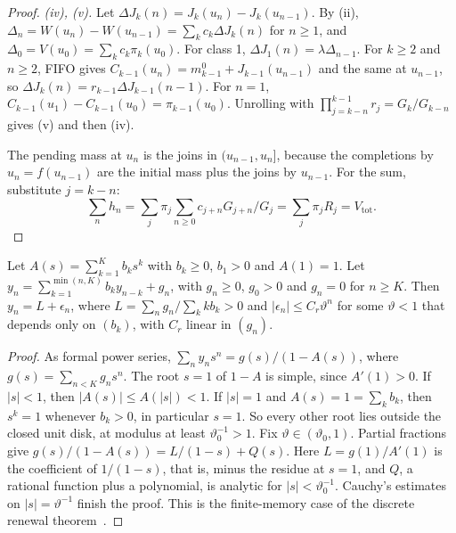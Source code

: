 \begin{proof}
\emph{(iv), (v).} Let $\Delta J_k(n)=J_k(u_n)-J_k(u_{n-1})$. By (ii), $\Delta_n=W(u_n)-W(u_{n-1})=\sum_kc_k\Delta J_k(n)$ for
$n\ge1$, and $\Delta_0=V(u_0)=\sum_kc_k\pi_k(u_0)$. For class 1, $\Delta J_1(n)=\lambda\Delta_{n-1}$. For $k\ge2$ and
$n\ge2$, FIFO gives $C_{k-1}(u_n)=m^0_{k-1}+J_{k-1}(u_{n-1})$ and the same at $u_{n-1}$, so
$\Delta J_k(n)=r_{k-1}\Delta J_{k-1}(n-1)$. For $n=1$, $C_{k-1}(u_1)-C_{k-1}(u_0)=\pi_{k-1}(u_0)$. Unrolling with
$\prod_{j=k-n}^{k-1}r_j=G_k/G_{k-n}$ gives (v) and then (iv).

The pending mass at $u_n$ is the joins in $(u_{n-1},u_n]$, because the completions by $u_n=f(u_{n-1})$ are the initial mass
plus the joins by $u_{n-1}$. For the sum, substitute $j=k-n$:
\[
\sum_nh_n=\sum_j\pi_j\sum_{n\ge0}c_{j+n}G_{j+n}/G_j=\sum_j\pi_jR_j=V_{\mathrm{tot}}.
\]
\end{proof}

\begin{lemma}\label{lem:renewal}
Let $A(s)=\sum_{k=1}^Kb_ks^k$ with $b_k\ge0$, $b_1>0$ and $A(1)=1$. Let
$y_n=\sum_{k=1}^{\min(n,K)}b_ky_{n-k}+g_n$, with $g_n\ge0$, $g_0>0$ and $g_n=0$ for $n\ge K$. Then $y_n=L+\epsilon_n$, where
$L=\sum_ng_n/\sum_kkb_k>0$ and $|\epsilon_n|\le C_r\vartheta^n$ for some $\vartheta<1$ that depends only on $(b_k)$, with
$C_r$ linear in $(g_n)$.
\end{lemma}

\begin{proof}
As formal power series, $\sum_ny_ns^n=g(s)/(1-A(s))$, where $g(s)=\sum_{n<K}g_ns^n$. The root $s=1$ of $1-A$ is simple, since
$A'(1)>0$. If $|s|<1$, then $|A(s)|\le A(|s|)<1$. If $|s|=1$ and $A(s)=1=\sum_kb_k$, then $s^k=1$ whenever $b_k>0$, in
particular $s=1$. So every other root lies outside the closed unit disk, at modulus at least $\vartheta_0^{-1}>1$. Fix
$\vartheta\in(\vartheta_0,1)$. Partial fractions give $g(s)/(1-A(s))=L/(1-s)+Q(s)$. Here $L=g(1)/A'(1)$ is the coefficient
of $1/(1-s)$, that is, minus the residue at $s=1$, and $Q$, a rational function plus a polynomial, is analytic for
$|s|<\vartheta_0^{-1}$. Cauchy's estimates on $|s|=\vartheta^{-1}$ finish the proof. This is the finite-memory case of the
discrete renewal theorem~\citep{feller1968introduction}.
\end{proof}

